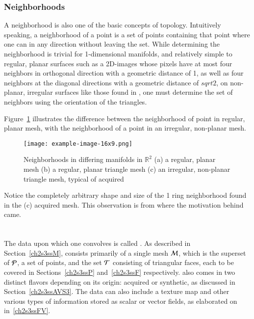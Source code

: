 \subsubsection{Neighborhoods}
A neighborhood is also one of the basic concepts of topology. Intuitively speaking, a neighborhood of a point is a set of points containing that point where one can in any direction without leaving the set.  While determining the neighborhood is trivial for 1-dimensional manifolds, and relatively simple to regular, planar surfaces such as a 2D-images whose pixels have at most four neighbors in orthogonal direction with a geometric distance of 1, as well as four neighbors at the diagonal directions with a geometric distance of $sqrt{2}$, on non-planar, irregular surfaces like those found in \tdd{}, one must determine the set of neighbors using the orientation of the triangles.

Figure~\ref{fig:neighborhoods} illustrates the difference between the neighborhood of point in regular, planar mesh, with the neighborhood of a point in an irregular, non-planar mesh.
\begin{figure}
\ffigbox
	{\texttt{[image: example-image-16x9.png]}}
	{\caption[Regular Planar and Irregular Non-planar Neighborhoods in $\mathbb{R}^2$]{Neighborhoods in differing manifolds in $\mathbb{R}^2$ (a) a regular, planar mesh (b) a regular, planar triangle mesh (c) an irregular, non-planar triangle mesh, typical of acquired \tdd{}}\label{fig:neighborhoods}}
\end{figure}
Notice the completely arbitrary shape and size of the 1 ring neighborhood found in the (c) acquired mesh. This observation is from where the motivation behind  came.
%
%
%
%
%
\section{\tdd}
\label{ch2s3}
The data upon which one convolves  is called \tdd{}. As described in Section~\ref{ch2s3ssM}, \tdd{} consists primarily of a single mesh $\mathcal{M}$, which is the superset of $\mathcal{P}$, a set of points, and the set $\mathcal{T}$ consisting of triangular faces, each to be covered in Sections~\ref{ch2s3ssP} and~\ref{ch2s3ssF} respectively. \tdd{} also comes in two distinct flavors depending on its origin: acquired or synthetic, as discussed in Section~\ref{ch2s3ssAVS3}. The data can also include a texture map and other various types of information stored as scalar or vector fields, as elaborated on in~\ref{ch2s3ssFV}.
%
